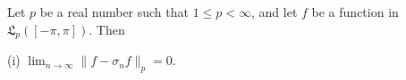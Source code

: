 Let $p$ be a real number such that $1 \leq p < \infty$, and let $f$ be a function in $\mathfrak{L}_p([- \pi, \pi])$. Then

(i) $\lim_{n \to \infty} \|f - \sigma_n f\|_p = 0$.